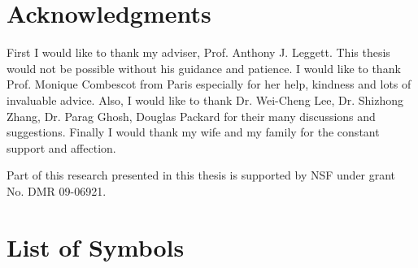 \documentclass[edeposit,fullpage,prequest,10pt]{uiucthesis2009}
\begin{document}
\chapter*{Acknowledgments}
First I would like to thank my adviser, Prof. Anthony J. Leggett.  This thesis would not be possible without his guidance and patience.  I would like to thank Prof. Monique Combescot from Paris especially for her help, kindness and lots of invaluable advice.  Also, I would like to thank Dr. Wei-Cheng Lee, Dr. Shizhong Zhang, Dr. Parag Ghosh,  Douglas
Packard  for their many discussions and suggestions.  Finally I would thank my wife and my family for the constant support and affection.  

Part of this research presented in  this thesis  is supported  by NSF under grant No. DMR 09-06921. 


\tableofcontents

%

\chapter{List of Symbols}
\end{document}
